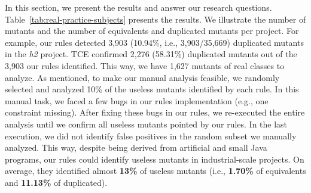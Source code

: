 In this section, we present the results and answer our research questions. 
Table~\ref{tab:real-practice-subjects} presents the results. 
We illustrate the number of mutants and the number of equivalents and duplicated mutants per project. 
For example, our rules detected 3,903 (10.94\%, i.e., 3,903/35,669) duplicated mutants in the \textit{h2} project. 
TCE confirmed 2,276 (58.31\%) duplicated mutants out of the 3,903 our rules identified. 
This way, we have 1,627 mutants of real classes to analyze. 
As mentioned, to make our manual analysis feasible, we randomly selected and analyzed 10\% of the useless mutants identified by each rule. 
In this manual task, we faced a few bugs in our rules implementation (e.g., one constraint missing). 
After fixing these bugs in our rules, we re-executed the entire analysis until we confirm all useless mutants pointed by our rules.
In the last execution, we did not identify false positives in the random subset we manually analyzed. 
This way, despite being derived from artificial and small Java programs, our rules could identify useless mutants in industrial-scale projects. 
On average, they identified almost \textbf{13\%} of useless mutants (i.e., \textbf{1.70\%} of equivalents and \textbf{11.13\%} of duplicated).


